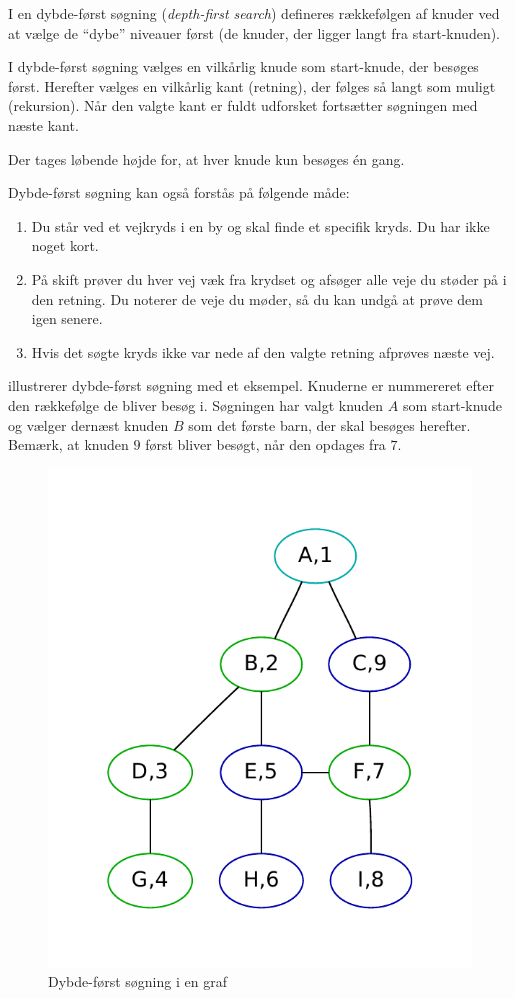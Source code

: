 \documentclass[10pt,a4paper,danish]{article}
\begin{document}
I en dybde-først søgning (\textit{depth-first search}) defineres
rækkefølgen af knuder ved at vælge de "`dybe"' niveauer først (de knuder,
der ligger langt fra start-knuden).

I dybde-først søgning vælges en vilkårlig knude som start-knude, der
besøges først. Herefter vælges en vilkårlig kant (retning), der følges
så langt som muligt (rekursion). Når den valgte kant er fuldt
udforsket fortsætter søgningen med næste kant.

Der tages løbende højde for, at hver knude kun besøges \'en gang.

Dybde-først søgning kan også forstås på følgende måde:
\begin{enumerate}
\item Du står ved et vejkryds i en by og skal finde et specifik
  kryds. Du har ikke noget kort.
\item På skift prøver du hver vej væk fra krydset og afsøger alle veje
  du støder på i den retning. Du noterer de veje du møder, så du kan
  undgå at prøve dem igen senere.
\item Hvis det søgte kryds ikke var nede af den valgte retning
  afprøves næste vej.
\end{enumerate}


 illustrerer dybde-først søgning med et
eksempel. Knuderne er nummereret efter den rækkefølge de bliver besøg
i. Søgningen har valgt knuden $A$ som start-knude og vælger dernæst
knuden $B$ som det første barn, der skal besøges herefter. Bemærk, at
knuden $9$ først bliver besøgt, når den opdages fra $7$.




\begin{figure}[h]\centering
\includegraphics[width=.6\textwidth]{graphs/depth-first.pdf}
\caption{Dybde-først søgning i en graf}
\label{fig:depth-first}
\end{figure}
\end{document}
